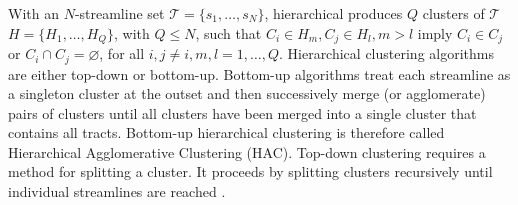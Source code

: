 With an $N$-streamline set $\mathcal{T} = \{s_1,\ldots,s_N\}$, hierarchical produces $Q$ clusters of $\mathcal{T}$
$H = \{H_{1}, \ldots, H_{Q}\}$, with $Q \leq N$, such that $C_{i} \in H_{m}, C_{j} \in H_{l}, m > l$
imply $C_{i} \in C_{j}$ or $C_{i} \cap C_{j} = \varnothing$, for all $i,j \neq i, m, l = 1, \ldots, Q$.
Hierarchical clustering algorithms are either top-down or bottom-up. Bottom-up algorithms treat each streamline as a singleton cluster at the outset and then successively merge (or agglomerate) pairs of clusters until all clusters have been merged into a single cluster that contains all tracts. Bottom-up hierarchical clustering is therefore called Hierarchical Agglomerative Clustering (HAC). Top-down clustering requires a method for splitting a cluster. It proceeds by splitting clusters recursively until individual streamlines are reached \cite{johnson1967hierarchical}.

